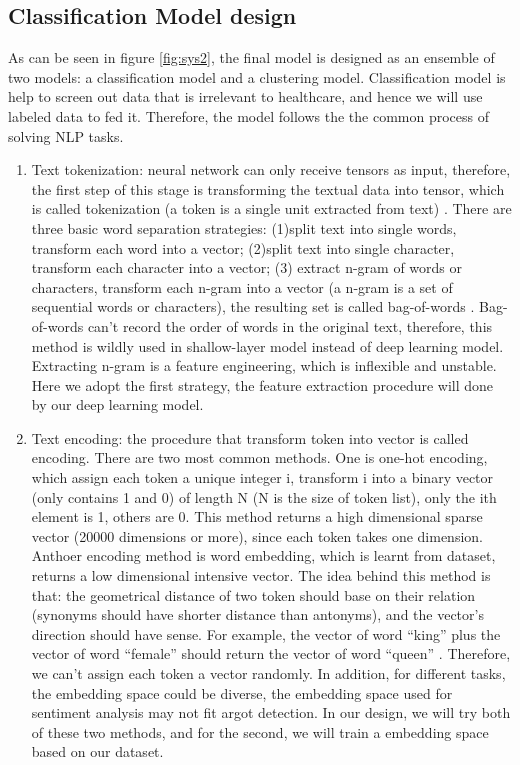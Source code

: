 \subsection{Classification Model design}
\label{sec:First round predictor design}
As can be seen in figure \ref{fig:sys2}, the final model is designed as an ensemble of two models: a classification model and a clustering model. Classification model is help to screen out data that is irrelevant to healthcare, and hence we will use labeled data to fed it. Therefore, the model follows the the common process of solving NLP tasks.
\begin{enumerate}
    \item Text tokenization: neural network can only receive tensors as input, therefore, the first step of this stage is transforming the textual data into tensor, which is called tokenization (a token is a single unit extracted from text) \cite{Chollet:2017:DLP:3203489}. There are three basic word separation strategies: (1)split text into single words, transform each word into a vector; (2)split text into single character, transform each character into a vector; (3) extract n-gram of words or characters, transform each n-gram into a vector (a n-gram is a set of sequential words or characters), the resulting set is called bag-of-words \cite{Chollet:2017:DLP:3203489}. Bag-of-words can't record the order of words in the original text, therefore, this method is wildly used in shallow-layer model instead of deep learning model. Extracting n-gram is a feature engineering, which is inflexible and unstable. Here we adopt the first strategy, the feature extraction procedure will done by our deep learning model.
    \item Text encoding: the procedure that transform token into vector is called encoding. There are two most common methods. One is one-hot encoding, which assign each token a unique integer i, transform i into a binary vector (only contains 1 and 0) of length N (N is the size of token list), only the ith element is 1, others are 0. This method returns a high dimensional sparse vector (20000 dimensions or more), since each token takes one dimension. Anthoer encoding method is word embedding, which is learnt from dataset, returns a low dimensional intensive vector. The idea behind this method is that: the geometrical distance of two token should base on their relation (synonyms should have shorter distance than antonyms), and the vector's direction should have sense. For example, the vector of word ``king'' plus the vector of word ``female'' should return the vector of word ``queen'' \cite{Chollet:2017:DLP:3203489}. Therefore, we can't assign each token a vector randomly. In addition, for different tasks, the embedding space could be diverse, the embedding space used for sentiment analysis may not fit argot detection. In our design, we will try both of these two methods, and for the second, we will train a embedding space based on our dataset.
\end{enumerate}
